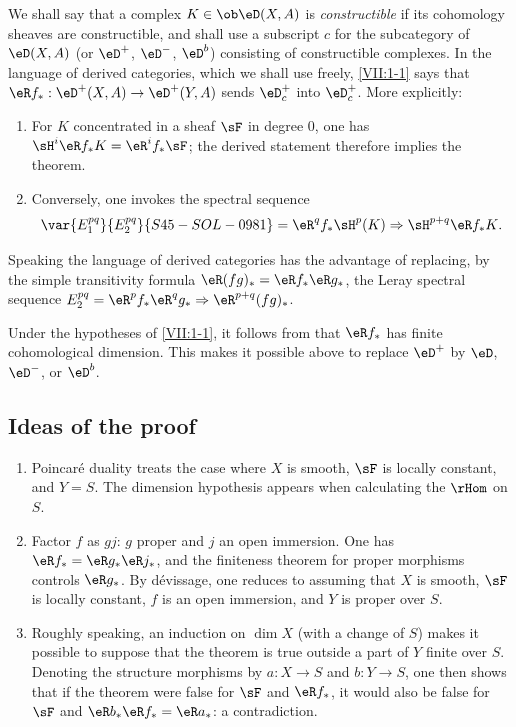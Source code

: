 We shall say that a complex $K\in\ob\eD(X,A)$ is \emph{constructible} if its
cohomology sheaves are constructible, and shall use a subscript $c$ for the
subcategory of $\eD(X,A)$ (or $\eD^+$, $\eD^-$, $\eD^b$) consisting of
constructible complexes. In the language of derived categories, which we
shall use freely, \ref{VII:1-1} says that
$\eR f_\ast:\eD^+(X,A) \to \eD^+(Y,A)$ sends $\eD_c^+$ into $\eD_c^+$.
More explicitly:
\begin{enumerate}[\indent a)]
  \item For $K$ concentrated in a sheaf $\sF$ in degree $0$, one has
    $\sH^i\eR f_\ast K = \eR^i f_\ast \sF$; the derived statement therefore
    implies the theorem.
  \item Conversely, one invokes the spectral sequence
    \[
      \var{E_1^{p q}}{E_2^{p q}}{S45-SOL-0981} = \eR^q f_\ast \sH^p(K) \Rightarrow \sH^{p+q} \eR f_\ast K \text{.}
    \]
\end{enumerate}

Speaking the language of derived categories has the advantage of replacing,
by the simple transitivity formula $\eR(f g)_\ast = \eR f_\ast \eR g_\ast$,
the Leray spectral sequence
$E_2^{p q} = \eR^p f_\ast \eR^q g_\ast \Rightarrow \eR^{p+q} (f g)_\ast$.

Under the hypotheses of \ref{VII:1-1}, it follows from \cite[X]{sga4} that
$\eR f_\ast$ has finite cohomological dimension. This makes it possible above
to replace $\eD^+$ by $\eD$, $\eD^-$, or $\eD^b$.






\subsection{Ideas of the proof}\label{VII:1-4}
\begin{enumerate}[\indent a)]
  \item Poincaré duality treats the case where $X$ is smooth, $\sF$ is
    locally constant, and $Y=S$. The dimension hypothesis appears when calculating the $\rHom$ on $S$.
  \item Factor $f$ as $g j$: $g$ proper and $j$ an open immersion. One has
    $\eR f_\ast = \eR g_\ast \eR j_\ast$, and the finiteness theorem for
    proper morphisms controls $\eR g_\ast$. By dévissage, one reduces to
    assuming that $X$ is smooth, $\sF$ is locally constant, $f$ is an open
    immersion, and $Y$ is proper over $S$.
  \item Roughly speaking, an induction on $\dim X$ (with a change of $S$) makes it
    possible to suppose that the theorem is true outside a part of $Y$ finite
    over $S$. Denoting the structure morphisms by $a:X\to S$ and $b:Y\to S$,
    one then shows that if the theorem were false for $\sF$ and
    $\eR f_\ast$, it would also be false for $\sF$ and
    $\eR b_\ast \eR f_\ast = \eR a_\ast$: a contradiction.
\end{enumerate}






